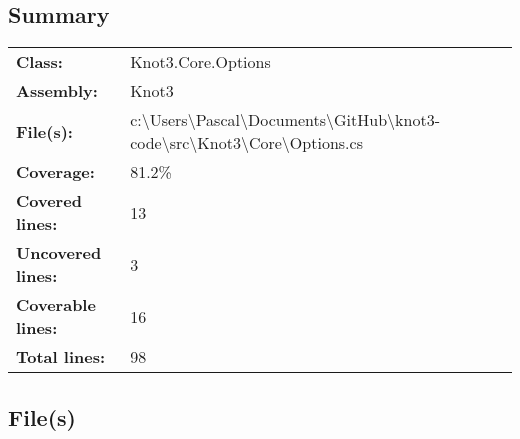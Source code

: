 \documentclass[a4paper,10pt]{article}
\begin{document}
\subsection{Summary}
\begin{longtable}[l]{ll}
\textbf{Class:} & Knot3.Core.Options\\
\textbf{Assembly:} & Knot3\\
\textbf{File(s):} & \begin{minipage}[t]{12cm}{c:\textbackslash Users\textbackslash Pascal\textbackslash Documents\textbackslash GitHub\textbackslash knot3-code\textbackslash src\textbackslash Knot3\textbackslash Core\textbackslash Options.cs}\end{minipage} \\
\textbf{Coverage:} & 81.2\%\\
\textbf{Covered lines:} & 13\\
\textbf{Uncovered lines:} & 3\\
\textbf{Coverable lines:} & 16\\
\textbf{Total lines:} & 98\\
\end{longtable}
\subsection{File(s)}
\end{document}
